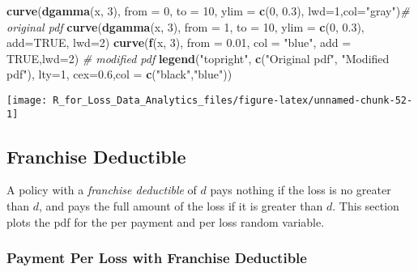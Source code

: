 \documentclass[]{book}
\newenvironment{Shaded}{\begin{snugshade}}{\end{snugshade}}
\newcommand{\KeywordTok}[1]{\textcolor[rgb]{0.13,0.29,0.53}{\textbf{#1}}}
\newcommand{\DataTypeTok}[1]{\textcolor[rgb]{0.13,0.29,0.53}{#1}}
\newcommand{\DecValTok}[1]{\textcolor[rgb]{0.00,0.00,0.81}{#1}}
\newcommand{\FloatTok}[1]{\textcolor[rgb]{0.00,0.00,0.81}{#1}}
\newcommand{\StringTok}[1]{\textcolor[rgb]{0.31,0.60,0.02}{#1}}
\newcommand{\CommentTok}[1]{\textcolor[rgb]{0.56,0.35,0.01}{\textit{#1}}}
\newcommand{\OtherTok}[1]{\textcolor[rgb]{0.56,0.35,0.01}{#1}}
\newcommand{\NormalTok}[1]{#1}
\theoremstyle{definition}
\theoremstyle{definition}
\theoremstyle{definition}
\theoremstyle{remark}
\begin{document}
\begin{Shaded}
\begin{Highlighting}[]
\KeywordTok{curve}\NormalTok{(}\KeywordTok{dgamma}\NormalTok{(x, }\DecValTok{3}\NormalTok{), }\DataTypeTok{from =} \DecValTok{0}\NormalTok{, }\DataTypeTok{to =} \DecValTok{10}\NormalTok{, }\DataTypeTok{ylim =} \KeywordTok{c}\NormalTok{(}\DecValTok{0}\NormalTok{, }\FloatTok{0.3}\NormalTok{), }\DataTypeTok{lwd=}\DecValTok{1}\NormalTok{,}\DataTypeTok{col=}\StringTok{"gray"}\NormalTok{)}\CommentTok{# original pdf}
\KeywordTok{curve}\NormalTok{(}\KeywordTok{dgamma}\NormalTok{(x, }\DecValTok{3}\NormalTok{), }\DataTypeTok{from =} \DecValTok{1}\NormalTok{, }\DataTypeTok{to =} \DecValTok{10}\NormalTok{, }\DataTypeTok{ylim =} \KeywordTok{c}\NormalTok{(}\DecValTok{0}\NormalTok{, }\FloatTok{0.3}\NormalTok{), }\DataTypeTok{add=}\OtherTok{TRUE}\NormalTok{, }\DataTypeTok{lwd=}\DecValTok{2}\NormalTok{)}
\KeywordTok{curve}\NormalTok{(}\KeywordTok{f}\NormalTok{(x, }\DecValTok{3}\NormalTok{), }\DataTypeTok{from =} \FloatTok{0.01}\NormalTok{, }\DataTypeTok{col =} \StringTok{"blue"}\NormalTok{, }\DataTypeTok{add =} \OtherTok{TRUE}\NormalTok{,}\DataTypeTok{lwd=}\DecValTok{2}\NormalTok{)     }\CommentTok{# modified pdf}
\KeywordTok{legend}\NormalTok{(}\StringTok{"topright"}\NormalTok{, }\KeywordTok{c}\NormalTok{(}\StringTok{"Original pdf"}\NormalTok{, }\StringTok{"Modified pdf"}\NormalTok{), }\DataTypeTok{lty=}\DecValTok{1}\NormalTok{, }\DataTypeTok{cex=}\FloatTok{0.6}\NormalTok{,}\DataTypeTok{col =} \KeywordTok{c}\NormalTok{(}\StringTok{"black"}\NormalTok{,}\StringTok{"blue"}\NormalTok{))}
\end{Highlighting}
\end{Shaded}

\begin{center}\texttt{[image: R\_for\_Loss\_Data\_Analytics\_files/figure-latex/unnamed-chunk-52-1]} \end{center}

\subsection{Franchise Deductible}\label{franchise-deductible}

A policy with a \emph{franchise deductible} of \(d\) pays nothing if the
loss is no greater than \(d\), and pays the full amount of the loss if
it is greater than \(d\). This section plots the pdf for the per payment
and per loss random variable.

\subsubsection{Payment Per Loss with Franchise
Deductible}\label{payment-per-loss-with-franchise-deductible}
\end{document}
